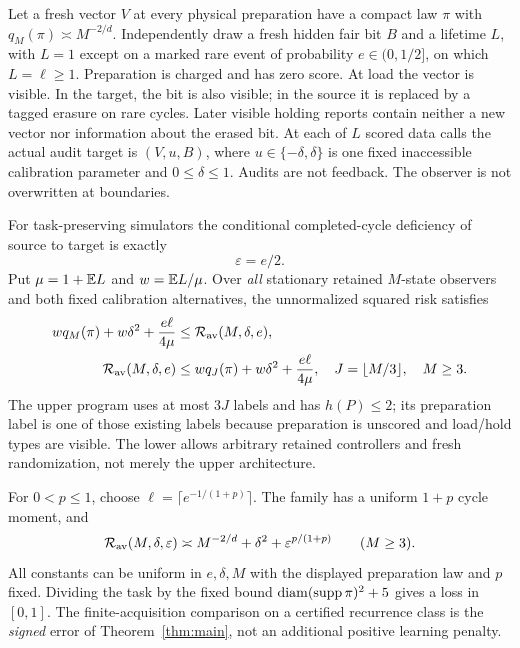 \begin{theorem}\label{thm:joint}
Let a fresh vector $V$ at every physical preparation have a compact law $\pi$ with $q_M(\pi)\asymp M^{-2/d}$. Independently draw a fresh hidden fair bit $B$ and a lifetime $L$, with $L=1$ except on a marked rare event of probability $e\in(0,1/2]$, on which $L=\ell\ge1$. Preparation is charged and has zero score. At load the vector is visible. In the target, the bit is also visible; in the source it is replaced by a tagged erasure on rare cycles. Later visible holding reports contain neither a new vector nor information about the erased bit. At each of $L$ scored data calls the actual audit target is
$(V,u,B)$, where $u\in\{-\delta,\delta\}$ is one fixed inaccessible calibration parameter and $0\le\delta\le1$. Audits are not feedback. The observer is not overwritten at boundaries.

For task-preserving simulators the conditional completed-cycle deficiency of source to target is exactly
\begin{equation}\label{eq:attainedeps}
 \varepsilon=e/2.
\end{equation}
Put $\mu=1+\mathbb E L$ and $w=\mathbb E L/\mu$. Over \emph{all} stationary retained $M$-state observers and both fixed calibration alternatives, the unnormalized squared risk satisfies
\begin{align}\label{eq:jointbounds}
 wq_M(\pi)+w\delta^2+{e\ell\over4\mu}
 &\le \mathcal R_{\mathrm{av}}(M,\delta,e),\\
 \mathcal R_{\mathrm{av}}(M,\delta,e)
 &\le wq_J(\pi)+w\delta^2+{e\ell\over4\mu},
 \quad J=\lfloor M/3\rfloor,\quad M\ge3.\nonumber
\end{align}
The upper program uses at most $3J$ labels and has $h(P)\le2$; its preparation label is one of those existing labels because preparation is unscored and load/hold types are visible. The lower allows arbitrary retained controllers and fresh randomization, not merely the upper architecture.

For $0<p\le1$, choose $\ell=\lceil e^{-1/(1+p)}\rceil$. The family has a uniform $1+p$ cycle moment, and
\begin{equation}\label{eq:jointlaw}
 \mathcal R_{\mathrm{av}}(M,\delta,\varepsilon)
 \asymp M^{-2/d}+\delta^2+\varepsilon^{p/(1+p)}\qquad(M\ge3).
\end{equation}
All constants can be uniform in $e,\delta,M$ with the displayed preparation law and $p$ fixed. Dividing the task by the fixed bound $\operatorname{diam}(\operatorname{supp}\pi)^2+5$ gives a loss in $[0,1]$. The finite-acquisition comparison on a certified recurrence class is the \emph{signed} error of Theorem~\ref{thm:main}, not an additional positive learning penalty.
\end{theorem}

